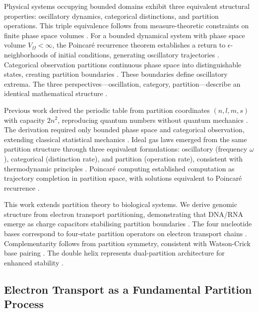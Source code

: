 \documentclass[11pt,a4paper]{article}
\theoremstyle{remark}
\begin{document}
Physical systems occupying bounded domains exhibit three equivalent structural properties: oscillatory dynamics, categorical distinctions, and partition operations. This triple equivalence follows from measure-theoretic constraints on finite phase space volumes \citep{poincare1890probleme, birkhoff1931proof, arnold1978mathematical}. For a bounded dynamical system with phase space volume $V_{\Omega} < \infty$, the Poincaré recurrence theorem establishes a return to $\epsilon$-neighborhoods of initial conditions, generating oscillatory trajectories \citep{poincare1890probleme}. Categorical observation partitions continuous phase space into distinguishable states, creating partition boundaries \citep{kolmogorov1957theory}. These boundaries define oscillatory extrema. The three perspectives—oscillation, category, partition—describe an identical mathematical structure \citep{Sachikonye2025_IdealGas, Sachikonye2025_Poincare}.

Previous work derived the periodic table from partition coordinates $(n,l,m,s)$ with capacity $2n^2$, reproducing quantum numbers without quantum mechanics \citep{Sachikonye2025_Partition}. The derivation required only bounded phase space and categorical observation, extending classical statistical mechanics \citep{reif1965fundamentals, callen1985thermodynamics}. Ideal gas laws emerged from the same partition structure through three equivalent formulations: oscillatory (frequency $\omega$), categorical (distinction rate), and partition (operation rate), consistent with thermodynamic principles \citep{jarzynski1997nonequilibrium, crooks1999entropy, Sachikonye2025_IdealGas}. Poincaré computing established computation as trajectory completion in partition space, with solutions equivalent to Poincaré recurrence \citep{poincare1890probleme, Sachikonye2025_Poincare}.

This work extends partition theory to biological systems. We derive genomic structure from electron transport partitioning, demonstrating that DNA/RNA emerge as charge capacitors stabilising partition boundaries \citep{watson1953molecular, bloomfield1997dna, kornyshev2007physics}. The four nucleotide bases correspond to four-state partition operators on electron transport chains \citep{nicholls2013bioenergetics, mitchell1961coupling}. Complementarity follows from partition symmetry, consistent with Watson-Crick base pairing \citep{watson1953molecular}. The double helix represents dual-partition architecture for enhanced stability \citep{travers2015dna}.

\subsection{Electron Transport as a Fundamental Partition Process}
\end{document}
